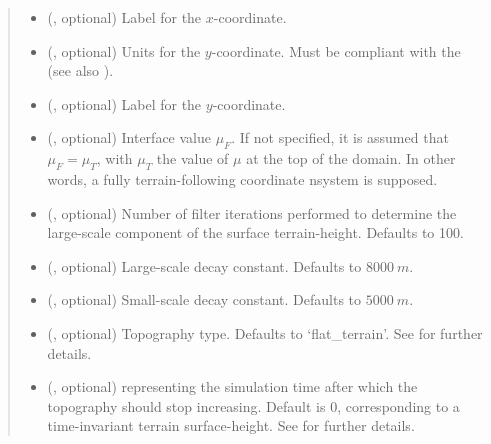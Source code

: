 \documentclass[letterpaper,10pt,english]{sphinxmanual}
\begin{document}
\begin{fulllineitems}
\begin{fulllineitems}
\begin{quote}
\begin{description}
\begin{itemize}
\item {} 
 (, optional) \textendash{} Label for the \(x\)-coordinate.

\item {} 
 (, optional) \textendash{} 
Units for the \(y\)-coordinate. Must be compliant with the 
(see also {\hyperref[\detokenize{api:tasmania.grids.axis.Axis.__init__}]{}}).


\item {} 
 (, optional) \textendash{} Label for the \(y\)-coordinate.

\item {} 
 (, optional) \textendash{} Interface value \(\mu_F\). If not specified, it is assumed that \(\mu_F = \mu_T\), with
\(\mu_T\) the value of \(\mu\) at the top of the domain. In other words, a fully terrain-following
coordinate nsystem is supposed.

\item {} 
 (, optional) \textendash{} Number of filter iterations performed to determine the large-scale component of the surface terrain-height.
Defaults to 100.

\item {} 
 (, optional) \textendash{} Large-scale decay constant. Defaults to \(8000 ~ m\).

\item {} 
 (, optional) \textendash{} Small-scale decay constant. Defaults to \(5000 ~ m\).

\item {} 
 (, optional) \textendash{} Topography type. Defaults to ‘flat\_terrain’. See {\hyperref[\detokenize{api:module-tasmania.grids.topography}]{}} for further details.

\item {} 
 (, optional) \textendash{}  representing the simulation time after which the topography should stop
increasing. Default is 0, corresponding to a time-invariant terrain surface-height.
See {\hyperref[\detokenize{api:module-tasmania.grids.topography}]{}} for further details.


\end{itemize}
\end{description}
\end{quote}
\end{fulllineitems}
\end{fulllineitems}
\end{document}

